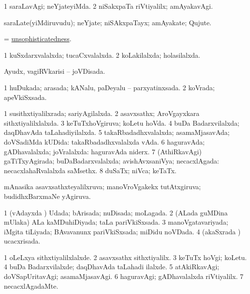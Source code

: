 \bentry
{} 
\gl{\kirxvi}
\expl{}
\bmng
\bnum
\num{1} saraLavAgi; neYjateyiMda. 
\num{2} niSakxpaTa riVtiyalilx; amAyakavAgi. 
\enum
\emng
\eentry

\bentry
{} 
\gl{\nA}
\expl{}
\bmng
saraLate(yiMdiruvudu); neYjate; niSAkxpaTayx; amAyakate; Qujute. 
\emng
\eentry

\bentry
{} 
\gl{\nA}
\expl{}
\bmng
= \hyperlink{unsophisticatedness}{unsophisticatedness}. 
\emng
\eentry

\bentry
{} 
\gl{\gu}
\expl{}
\bmng
\bnum
\num{1} kuSxdarxvalalxda; tucaCxvalalxda. 
\num{2} koLakilalxda; holasilalxda. 
\enum
\emng
\eentry

\bentry
{} 
\gl{\gu}
\expl{}
\bmng
Ayudx, vagiRVkarisi -- joVDisada. 
\emng
\eentry

\bentry
{} 
\gl{\gu}
\expl{}
\bmng
\bnum
\num{1} huDukada; arasada; kANalu, paDeyalu -- parxyatinxsada. 
\num{2} koVrada; apeVkiSxsada. 
\enum
\emng
\eentry

\bentry
{} 
\gl{\gu}
\expl{}
\bmng
\bnum
\num{1} susithxtiyalilxrada; sariyAgilalxda. 
\num{2} asavxsathx; AroVgayxkara sithxtiyalilxlalxda. 
\num{3} keTuTxhoVgiruva; koLetu hoVda. 
\num{4} buDa Badarxvilalxda; daqDhavAda taLahadiyilalxda. 
\num{5} takaRbadadhxvalalxda; asamaMjasavAda; doVSadiMda kUDida:  takaRbadadhxvalalxda vAda. 
\num{6} haguravAda; gADhavalalxda; joVralalxda:  haguravAda niderx. 
\num{7} (AthiRkavAgi) gaTiTxyAgirada; buDaBadarxvalalxda; avishAvxsaniVya; necacxlAgada:  necacxlahaRvalalxda saMsethx. 
\num{8} duSaTx; niVca; keTaTx. 
\enum
\emng

\noindent
\gl{\pagu}
\expl{}
\bmng
{} mAnasika asavxsathxteyalilxruva; manoVroVgakekx tutAtxgiruva; budidhxBarxmaNe yAgiruva. 
\emng
\eentry

\bentry
{} 
\gl{\gu}
\expl{}
\bmng
\bnum
\num{1} (vAdayxda \vi) Udada; bArisada; nuDisada; moLagada. 
\num{2} (ALada guMDina mUlaka) ALa kaMDuhiDiyada; taLa pariVkiSxsada. 
\num{3} manoVgatavariyada; iMgita tiLiyada; BAvavanunx pariVkiSxsada; miDidu noVDada. 
\num{4} (akaSxrada \vi) ucacxrisada. 
\enum
\emng
\eentry

\bentry
{} 
\gl{\kirxvi}
\expl{}
\bmng
\bnum
\num{1} oLeLxya sithxtiyalilxlalxde. 
\num{2} asavxsathx sithxtiyalilx. 
\num{3} keTuTx hoVgi; koLetu. 
\num{4} buDa Badarxvilalxde; daqDhavAda taLahadi ilalxde. 
\num{5} atAkiRkavAgi; doVSapUritavAgi; asamaMjasavAgi. 
\num{6} haguravAgi; gADhavalalxda riVtiyalilx. 
\num{7} necacxlAgadaMte. 
\enum
\emng
\eentry

